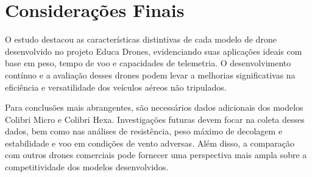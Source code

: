 \documentclass[conference]{IEEEtran}
\begin{document}
\section*{Considerações Finais}

O estudo destacou as características distintivas de cada modelo de drone desenvolvido no projeto Educa Drones, evidenciando suas aplicações ideais com base em peso, tempo de voo e capacidades de telemetria. O desenvolvimento contínuo e a avaliação desses drones podem levar a melhorias significativas na eficiência e versatilidade dos veículos aéreos não tripulados.

Para conclusões mais abrangentes, são necessários dados adicionais dos modelos Colibri Micro e Colibri Hexa. Investigações futuras devem focar na coleta desses dados, bem como nas análises de resistência, peso máximo de decolagem e estabilidade e voo em condições de vento adversas. Além disso, a comparação com outros drones comerciais pode fornecer uma perspectiva mais ampla sobre a competitividade dos modelos desenvolvidos.
\end{document}

